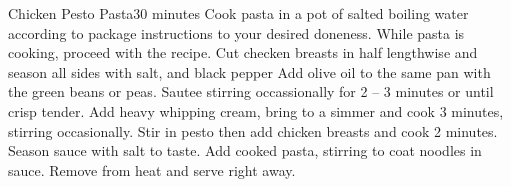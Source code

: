 \documentclass[../cookbook.tex]{subfiles}
\begin{document}
\begin{recipe}{Chicken Pesto Pasta}{}{30 minutes}
    Cook pasta in a pot of salted boiling water according to package
    instructions to your desired doneness. While pasta is cooking, proceed with
    the recipe.
    Cut checken breasts in half lengthwise and season all sides with salt, and
    black pepper
    Add olive oil to the same pan with the green beans or peas. Sautee stirring
    occassionally for 2 -- 3 minutes or until crisp tender.
    Add heavy whipping cream, bring to a simmer and cook 3 minutes, stirring
    occasionally. Stir in pesto then add chicken breasts and cook 2 minutes.
    Season sauce with salt to taste. Add cooked pasta, stirring to coat
    noodles in sauce. Remove from heat and serve right away.

\end{recipe}
\end{document}
